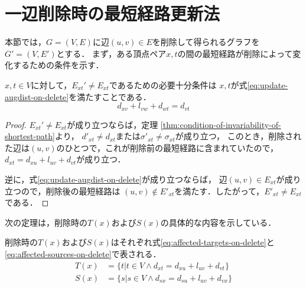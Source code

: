 \section{一辺削除時の最短経路更新法}
\label{sect:update-apsp-on-delete}
本節では，$G=(V,E)$に辺$(u,v)\in E$を削除して得られるグラフを$G'=(V,E')$とする．
まず，ある頂点ペア$x,t$の間の最短経路が削除によって変化するための条件を示す．

\begin{lemma}
  \label{lmm:update-augdist-on-delete}
  $x,t\in V$に対して，$E_{xt}'\neq E_{xt}$であるための必要十分条件は
  $x,t$が式\eqref{eq:update-augdist-on-delete}を満たすことである．
  \begin{equation}
    d_{xv}+l_{vw}+d_{wt}=d_{vt}
    \label{eq:update-augdist-on-delete}
  \end{equation}
\end{lemma}
\begin{proof}
  $E_{xt}'\neq E_{xt}$が成り立つならば，定理
  \ref{thm:condition-of-invariability-of-shortest-path}より，
  $d'_{xt}\neq d_{xt}$または$\sigma'_{xt}\neq\sigma_{xt}$が成り立つ，
  このとき，削除された辺は$(u,v)$のひとつで，これが削除前の最短経路に含まれていたので，
  $d_{xt}=d_{xu}+l_{uv}+d_{vt}$が成り立つ．

  逆に，式\eqref{eq:update-augdist-on-delete}が成り立つならば，
  辺$(u,v)\in E_{xt}$が成り立つので，削除後の最短経路は
  $(u,v)\notin E'_{xt}$を満たす．したがって，$E'_{xt}\neq E_{xt}$である．
\end{proof}

次の定理は，削除時の$T(x)$および$S(x)$の具体的な内容を示している．
\begin{theorem}
  \label{thm:affected-vertices-on-delete}
  削除時の$T(x)$および$S(x)$はそれぞれ式\eqref{eq:affected-targets-on-delete}と
  \eqref{eq:affected-sources-on-delete}で表される．
  \begin{align}
    T(x)&=\{t|t\in V\land d_{xt}=d_{xu}+l_{uv}+d_{vt}\}
    \label{eq:affected-targets-on-delete} \\
    S(x)&=\{s|s\in V\land d_{sx}=d_{su}+l_{uv}+d_{vx}\}
    \label{eq:affected-sources-on-delete}
  \end{align}
\end{theorem}

